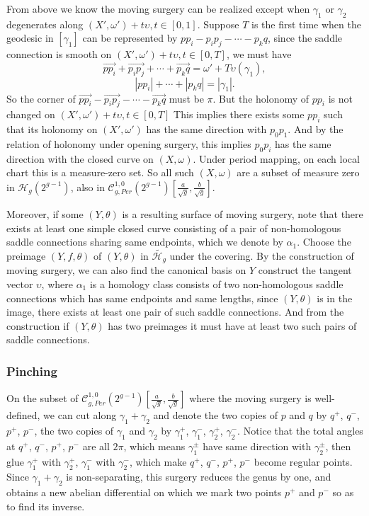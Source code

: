 \documentclass[12pt]{amsart} %
\theoremstyle{definition}
\theoremstyle{remark}
\numberwithin{equation}{section}
\renewcommand\H{{\mathcal H}}
\begin{document}
From above we know the moving surgery can be realized except when $\gamma_1$ or $\gamma_2$ degenerates along $(X',\omega')+t\upsilon, t\in [0,1]$.
Suppose $T$ is the first time when the geodesic in $[\gamma_1]$ can be represented by $pp_i-p_ip_j-\cdots-p_kq$,
since the saddle connection is smooth on $(X',\omega')+t\upsilon,t\in [0,T]$, 
we must have 
$$\vec{pp_i}+\vec{p_ip_j}+\cdots+\vec{p_kq}=\omega'+T\upsilon(\gamma_1),$$ 
$$|pp_i|+\cdots+|p_kq|=|\gamma_1|.$$
So the corner of $\vec{pp_i}-\vec{p_ip_j}-\cdots-\vec{p_kq}$ must be $\pi$. 
But the holonomy of $pp_i$ is not changed on $(X',\omega')+t\upsilon,t\in [0,T]$
This implies there exists some $pp_i$ such that its holonomy on $(X',\omega')$ has the same direction with $p_0p_1$. 
And by the relation of holonomy under opening surgery, this implies $p_0p_i$ has the same direction with the closed curve on $(X,\omega)$.
Under period mapping, on each local chart this is a measure-zero set.
So all such $(X,\omega)$ are a subset of measure zero in $ \H_g(2^{g-1})$, also in $\mathcal{C}^{1,0}_{g,Per}(2^{g-1})[\frac{a}{\sqrt{g}},\frac{b}{\sqrt{g}}]$.


Moreover, if some $(Y,\theta)$ is a resulting surface of moving surgery, note that there exists at least one simple closed curve consisting of a pair of non-homologous saddle
connections sharing same endpoints, which we denote by $\alpha_1$.
Choose the preimage $(Y,f,\theta)$ of $(Y,\theta)$ in $\tilde{\H_g}$ under the covering.
By the construction of moving surgery, we can also find the canonical basis on $Y$ construct the tangent vector $\upsilon$, where $\alpha_1$ is a homology class consists of two non-homologous saddle connections which has same endpoints and same lengths, 
since $(Y,\theta)$ is in  the image, there exists at least one pair of such saddle connections.
And from the construction if $(Y,\theta)$ has two preimages it must have at least two such pairs of saddle connections.

\subsubsection{Pinching}
On the subset of $\mathcal{C}^{1,0}_{g,Per}(2^{g-1})[\frac{a}{\sqrt{g}},\frac{b}{\sqrt{g}}]$ where the moving surgery is well-defined,
we can cut along $\gamma_1+\gamma_2$ and denote the two copies of $p$ and $q$ by $q^+$, $q^-$, $p^+$, $p^-$, 
the two copies of $\gamma_1$ and $\gamma_2$ by $\gamma^+_1$, $\gamma^-_1$, $\gamma^+_2$, $\gamma^-_2$.
Notice that the total angles at $q^+$, $q^-$, $p^+$, $p^-$ are all $2\pi$, 
which means $\gamma^\pm_1$ have same direction with $\gamma^\pm_2$,
then glue $\gamma^+_1$ with $\gamma^+_2$, $\gamma^-_1$ with $\gamma^-_2$, which make $q^+$, $q^-$, $p^+$, $p^-$ become regular points.
Since $\gamma_1+\gamma_2$ is non-separating, this surgery reduces the genus by one, and obtains a new abelian differential 
on which we mark two points $p^+$ and $p^-$ so as to find its inverse. 
\end{document}
